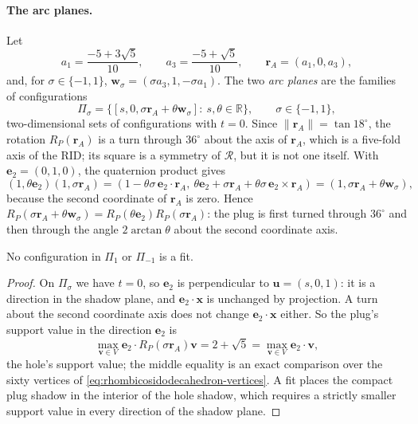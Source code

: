 \paragraph{The arc planes.}
Let
\[
  a_1=\frac{-5+3\sqrt5}{10},\qquad a_3=\frac{-5+\sqrt5}{10},\qquad
  \mathbf r_A=(a_1,0,a_3),
\]
and, for $\sigma\in\{-1,1\}$, $\mathbf w_\sigma=(\sigma a_3,1,-\sigma a_1)$.
The two \emph{arc planes} are the families of configurations
\begin{equation}\label{eq:arc-plane}
  \Pi_\sigma=\bigl\{[s,0,\sigma\mathbf r_A+\theta\mathbf w_\sigma]:\ s,\theta\in\mathbb R\bigr\},
  \qquad \sigma\in\{-1,1\},
\end{equation}
two-dimensional sets of configurations with $t=0$. Since
$\lVert\mathbf r_A\rVert=\tan18^\circ$, the rotation $R_P(\mathbf r_A)$ is a turn
through $36^\circ$ about the axis of $\mathbf r_A$, which is a five-fold axis
of the RID; its square is a symmetry of $\mathcal R$, but it is not one
itself. With $\mathbf e_2=(0,1,0)$, the quaternion product gives
\[
  (1,\theta\mathbf e_2)(1,\sigma\mathbf r_A)
  =(1-\theta\sigma\,\mathbf e_2\cdot\mathbf r_A,\ \theta\mathbf e_2+\sigma\mathbf r_A
     +\theta\sigma\,\mathbf e_2\times\mathbf r_A)
  =(1,\sigma\mathbf r_A+\theta\mathbf w_\sigma),
\]
because the second coordinate of $\mathbf r_A$ is zero. Hence
$R_P(\sigma\mathbf r_A+\theta\mathbf w_\sigma)=R_P(\theta\mathbf e_2)R_P(\sigma\mathbf r_A)$:
the plug is first turned through $36^\circ$ and then through the angle
$2\arctan\theta$ about the second coordinate axis.

\begin{lemma}\label{lem:arc-planes-contain-no-fit}
  No configuration in $\Pi_{1}$ or $\Pi_{-1}$ is a fit.
\end{lemma}
\begin{proof}
  On $\Pi_\sigma$ we have $t=0$, so $\mathbf e_2$ is perpendicular to
  $\mathbf u=(s,0,1)$: it is a direction in the shadow plane, and
  $\mathbf e_2\cdot\mathbf x$ is unchanged by projection. A turn about the
  second coordinate axis does not change $\mathbf e_2\cdot\mathbf x$ either.
  So the plug's support value in the direction $\mathbf e_2$ is
  \[
    \max_{\mathbf v\in V}\mathbf e_2\cdot R_P(\sigma\mathbf r_A)\mathbf v
     =2+\sqrt5=\max_{\mathbf v\in V}\mathbf e_2\cdot\mathbf v,
  \]
  the hole's support value; the middle equality is an exact comparison over
  the sixty vertices of \cref{eq:rhombicosidodecahedron-vertices}. A fit
  places the compact plug shadow in the interior of the hole shadow, which
  requires a strictly smaller support value in every direction of the
  shadow plane.
\end{proof}

